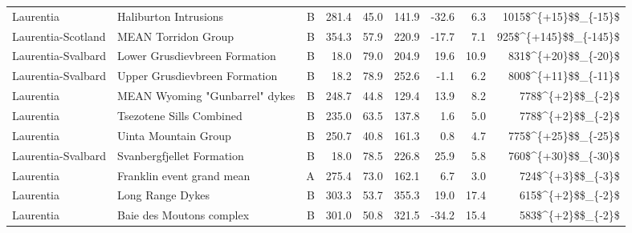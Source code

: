 \begin{longtable}{p{1 in}p{1 in}rrrrrrr}
                     Laurentia &                              Haliburton Intrusions &      B &     281.4 &      45.0 & 141.9 & -32.6 &       6.3 &   1015\$\textasciicircum \{+15\}\$\$\_\{-15\}\$ \\
            Laurentia-Scotland &                                MEAN Torridon Group &      B &     354.3 &      57.9 & 220.9 & -17.7 &       7.1 &  925\$\textasciicircum \{+145\}\$\$\_\{-145\}\$ \\
            Laurentia-Svalbard &                      Lower Grusdievbreen Formation &      B &      18.0 &      79.0 & 204.9 &  19.6 &      10.9 &    831\$\textasciicircum \{+20\}\$\$\_\{-20\}\$ \\
            Laurentia-Svalbard &                      Upper Grusdievbreen Formation &      B &      18.2 &      78.9 & 252.6 &  -1.1 &       6.2 &    800\$\textasciicircum \{+11\}\$\$\_\{-11\}\$ \\
                     Laurentia &                     MEAN Wyoming "Gunbarrel" dykes &      B &     248.7 &      44.8 & 129.4 &  13.9 &       8.2 &      778\$\textasciicircum \{+2\}\$\$\_\{-2\}\$ \\
                     Laurentia &                           Tsezotene Sills Combined &      B &     235.0 &      63.5 & 137.8 &   1.6 &       5.0 &      778\$\textasciicircum \{+2\}\$\$\_\{-2\}\$ \\
                     Laurentia &                               Uinta Mountain Group &      B &     250.7 &      40.8 & 161.3 &   0.8 &       4.7 &    775\$\textasciicircum \{+25\}\$\$\_\{-25\}\$ \\
            Laurentia-Svalbard &                          Svanbergfjellet Formation &      B &      18.0 &      78.5 & 226.8 &  25.9 &       5.8 &    760\$\textasciicircum \{+30\}\$\$\_\{-30\}\$ \\
                     Laurentia &                          Franklin event grand mean &      A &     275.4 &      73.0 & 162.1 &   6.7 &       3.0 &      724\$\textasciicircum \{+3\}\$\$\_\{-3\}\$ \\
                     Laurentia &                                   Long Range Dykes &      B &     303.3 &      53.7 & 355.3 &  19.0 &      17.4 &      615\$\textasciicircum \{+2\}\$\$\_\{-2\}\$ \\
                     Laurentia &                           Baie des Moutons complex &      B &     301.0 &      50.8 & 321.5 & -34.2 &      15.4 &      583\$\textasciicircum \{+2\}\$\$\_\{-2\}\$ \\

\end{longtable}
